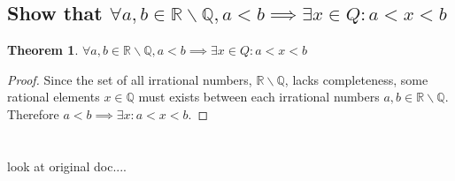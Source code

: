 \documentclass[]{article}
\newcommand{\R}{\mathbb{R}}
\newcommand{\Q}{\mathbb{Q}}
\newtheorem{theorem}{Theorem}
\begin{document}
\subsection{Show that
    $\forall a,b \in \R \backslash \Q, a < b \implies \exists x \in Q : a < x < b$
}
\begin{theorem}
    $\forall a,b \in \R \backslash \Q, a < b \implies \exists x \in Q : a < x < b$
\end{theorem}
\begin{proof}
    Since the set of all irrational numbers, $\R \backslash \Q$, lacks completeness, 
    some rational elements $x \in \Q$ must exists between each irrational numbers 
    $a,b \in \R \backslash \Q$. Therefore $a < b \implies \exists x : a < x < b$.
\end{proof}

\newpage
\section{}

\subsection{}
look at original doc....
\end{document}
